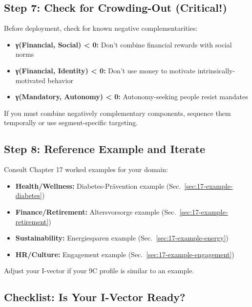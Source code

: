 \subsection{Step 7: Check for Crowding-Out (Critical!)}

Before deployment, check for known negative complementarities:

\begin{tcolorbox}[colback=red!5!white, colframe=red!75!black, title=\textbf{Known Crowding-Out Risks}]

\begin{itemize}[nosep]
\item \textbf{γ(Financial, Social) < 0:} Don't combine financial rewards with social norms
\item \textbf{γ(Financial, Identity) < 0:} Don't use money to motivate intrinsically-motivated behavior
\item \textbf{γ(Mandatory, Autonomy) < 0:} Autonomy-seeking people resist mandates
\end{itemize}

If you must combine negatively complementary components, sequence them temporally or use segment-specific targeting.

\end{tcolorbox}

\subsection{Step 8: Reference Example and Iterate}

Consult Chapter 17 worked examples for your domain:
\begin{itemize}[nosep]
\item \textbf{Health/Wellness:} Diabetes-Prävention example (Sec.~\ref{sec:17-example-diabetes})
\item \textbf{Finance/Retirement:} Altersvorsorge example (Sec.~\ref{sec:17-example-retirement})
\item \textbf{Sustainability:} Energiesparen example (Sec.~\ref{sec:17-example-energy})
\item \textbf{HR/Culture:} Engagement example (Sec.~\ref{sec:17-example-engagement})
\end{itemize}

Adjust your I-vector if your 9C profile is similar to an example.

\subsection{Checklist: Is Your I-Vector Ready?}

